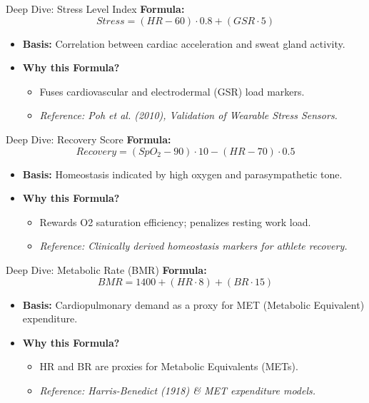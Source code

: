 \documentclass[aspectratio=169]{beamer}
\begin{document}
\begin{frame}{Deep Dive: Stress Level Index}
    \textbf{Formula:} \[ Stress = (HR - 60) \cdot 0.8 + (GSR \cdot 5) \]
    \begin{itemize}
        \item \textbf{Basis:} Correlation between cardiac acceleration and sweat gland activity.
        \item \textbf{Why this Formula?}
              \begin{itemize}
                   \item Fuses cardiovascular and electrodermal (GSR) load markers.
                   \item \textit{Reference: Poh et al. (2010), Validation of Wearable Stress Sensors.}
              \end{itemize}
    \end{itemize}
\end{frame}

\begin{frame}{Deep Dive: Recovery Score}
    \textbf{Formula:} \[ Recovery = (SpO_2 - 90) \cdot 10 - (HR - 70) \cdot 0.5 \]
    \begin{itemize}
        \item \textbf{Basis:} Homeostasis indicated by high oxygen and parasympathetic tone.
        \item \textbf{Why this Formula?}
              \begin{itemize}
                  \item Rewards O2 saturation efficiency; penalizes resting work load.
                  \item \textit{Reference: Clinically derived homeostasis markers for athlete recovery.}
              \end{itemize}
    \end{itemize}
\end{frame}

\begin{frame}{Deep Dive: Metabolic Rate (BMR)}
    \textbf{Formula:} \[ BMR = 1400 + (HR \cdot 8) + (BR \cdot 15) \]
    \begin{itemize}
        \item \textbf{Basis:} Cardiopulmonary demand as a proxy for MET (Metabolic Equivalent) expenditure.
        \item \textbf{Why this Formula?}
              \begin{itemize}
                  \item HR and BR are proxies for Metabolic Equivalents (METs).
                  \item \textit{Reference: Harris-Benedict (1918) \& MET expenditure models.}
              \end{itemize}
    \end{itemize}
\end{frame}
\end{document}
